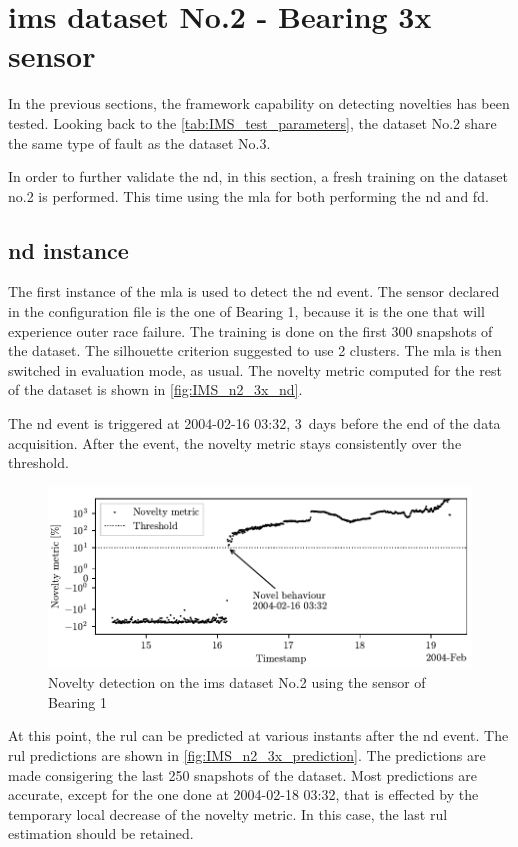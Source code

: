 \section{\gls{ims} dataset No.2 - Bearing 3x sensor}
\label{sec:IMS_n2_3x}

In the previous sections, the framework capability on detecting novelties has been tested. Looking back to the \autoref{tab:IMS_test_parameters}, the dataset No.2 share the same type of fault as the dataset No.3.

In order to further validate the \gls{nd}, in this section, a fresh training on the dataset no.2 is performed. This time using the \gls{mla} for both performing the \gls{nd} and \gls{fd}.

\subsection{\gls{nd} instance}
The first instance of the \gls{mla} is used to detect the \gls{nd} event. The sensor declared in the configuration file is the one of Bearing 1, because it is the one that will experience outer race failure. The training is done on the first 300 snapshots of the dataset. The silhouette criterion suggested to use 2 clusters. The \gls{mla} is then switched in evaluation mode, as usual. The novelty metric computed for the rest of the dataset is shown in \autoref{fig:IMS_n2_3x_nd}. 

The \gls{nd} event is triggered at 2004-02-16 03:32, 3~days before the end of the data acquisition. After the event, the novelty metric stays consistently over the threshold. 

\begin{figure}
    \centering
    \includegraphics{images/IMS/Test02/ND.pdf}
    \caption{Novelty detection on the \gls{ims} dataset No.2 using the sensor of Bearing 1}
    \label{fig:IMS_n2_3x_nd}
\end{figure}

At this point, the \gls{rul} can be predicted at various instants after the \gls{nd} event. The \gls{rul} predictions are shown in \autoref{fig:IMS_n2_3x_prediction}. The predictions are made consigering the last 250 snapshots of the dataset. Most predictions are accurate, except for the one done at 2004-02-18 03:32, that is effected by the temporary local decrease of the novelty metric. In this case, the last \gls{rul} estimation should be retained.

